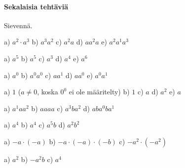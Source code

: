 \begin{tehtavasivu}
\paragraph*{Sekalaisia tehtäviä}

      Sievennä.
    
    \begin{tehtava}
        a) $a^2\cdot a^3$ \qquad
        b) $a^3a^2$ \qquad
        c) $a^2 a$ \qquad
        d) $a a^2 a$ \qquad
        e) $a^2a^1a^3$
        
        \begin{vastaus}
            a) $a^5$ \qquad
            b) $a^5$ \qquad
            c) $a^3$ \qquad
            d) $a^4$ \qquad
            e) $a^6$
        \end{vastaus}
    \end{tehtava}
    
    \begin{tehtava}
        a) $a^0$ \qquad
        b) $a^0a^0$ \qquad
        c) $a a^1$ \qquad
        d) $aa^0$ \qquad
        e) $a^0a^1$
        
        \begin{vastaus}
            a) $1$ \quad ($a\neq0$, koska $0^0$ ei ole määritelty) \qquad
            b) $1$ \qquad
            c) $a$ \qquad
            d) $a^2$ \qquad
            e) $a$
        \end{vastaus}
    \end{tehtava}
    
    \begin{tehtava}
        a) $a^1 a a^2$ \qquad
        b) $aaaa$ \qquad
        c) $a^3ba^2$ \qquad
        d) $aba^0ba^1$
        
        \begin{vastaus}
            a) $ a^4$ \qquad
            b) $a^4$ \qquad
            c) $a^5b$ \qquad
            d) $a^2b^2$
        \end{vastaus}
    \end{tehtava}
       

    \begin{tehtava}
        a) $-a\cdot(-a)$ \qquad
        b) $-a\cdot(-a)\cdot(-b)$ \qquad
        c) $-a^2\cdot(-a^2)$
    
        \begin{vastaus}
            a) $a^2$ \qquad
            b) $-a^2b$ \qquad
            c) $a^4$
        \end{vastaus}
    \end{tehtava}


\end{tehtavasivu}
